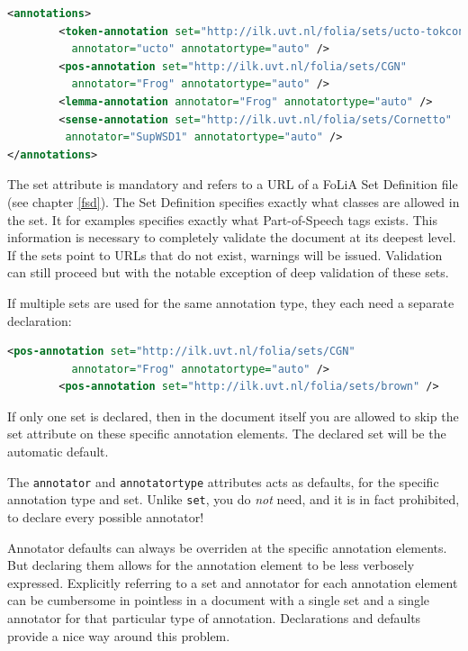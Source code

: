\documentclass[a4paper,12pt]{report}
\begin{document}
\begin{lstlisting}[language=xml]
<annotations>
        <token-annotation set="http://ilk.uvt.nl/folia/sets/ucto-tokconfig-nl" 
          annotator="ucto" annotatortype="auto" />
        <pos-annotation set="http://ilk.uvt.nl/folia/sets/CGN" 
          annotator="Frog" annotatortype="auto" />
        <lemma-annotation annotator="Frog" annotatortype="auto" />    
        <sense-annotation set="http://ilk.uvt.nl/folia/sets/Cornetto"
         annotator="SupWSD1" annotatortype="auto" />    
</annotations>
\end{lstlisting}

The set attribute is mandatory and refers to a URL of a FoLiA Set Definition file (see chapter \ref{fsd}). The Set Definition specifies exactly what classes are allowed in the set. It for examples specifies exactly what Part-of-Speech tags exists. This information is necessary to completely validate the document at its deepest level. If the sets point to URLs that do not exist, warnings will be issued. Validation can still proceed but with the notable exception of deep validation of these sets.

If multiple sets are used for the same annotation type, they each need a separate declaration:

\begin{lstlisting}[language=xml]
        <pos-annotation set="http://ilk.uvt.nl/folia/sets/CGN" 
          annotator="Frog" annotatortype="auto" />
        <pos-annotation set="http://ilk.uvt.nl/folia/sets/brown" />
\end{lstlisting}

If only one set is declared, then in the document itself you are allowed to skip the set attribute on these specific annotation elements. The declared set will be the automatic default. 

The \texttt{annotator} and \texttt{annotatortype} attributes acts as defaults, for the specific annotation type and set. Unlike \texttt{set}, you do \emph{not} need, and it is in fact prohibited, to declare every possible annotator!

Annotator defaults can always be overriden at the specific annotation elements. But declaring them allows for the annotation element to be less verbosely expressed. Explicitly referring to a set and annotator for each annotation element can be cumbersome in pointless in a document with a single set and a single annotator for that particular type of annotation. Declarations and defaults provide a nice way around this problem.
\end{document}
